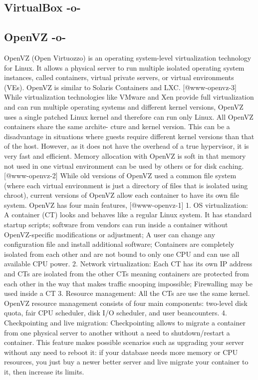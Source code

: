 \subsection{VirtualBox -o-}



\subsection{OpenVZ -o-}

OpenVZ (Open Virtuozzo) is an operating system-level virtualization
technology for Linux. It allows a physical server to run multiple
isolated operating system instances, called containers, virtual
private servers, or virtual environments (VEs). OpenVZ is similar to
Solaris Containers and LXC. [@www-openvz-3] While virtualization
technologies like VMware and Xen provide full virtualization and can
run multiple operating systems and different kernel versions, OpenVZ
uses a single patched Linux kernel and therefore can run only
Linux. All OpenVZ containers share the same archite- cture and kernel
version. This can be a disadvantage in situations where guests require
different kernel versions than that of the host. However, as it does
not have the overhead of a true hypervisor, it is very fast and
efficient. Memory allocation with OpenVZ is soft in that memory not
used in one virtual environment can be used by others or for disk
caching. [@www-openvz-2] While old versions of OpenVZ used a
common file system (where each virtual environment is just a directory
of files that is isolated using chroot), current versions of OpenVZ
allow each container to have its own file system.  OpenVZ has four
main features, [@www-openvz-1] 1. OS virtualization: A container
(CT) looks and behaves like a regular Linux system. It has standard
startup scripts; software from vendors can run inside a container
without OpenVZ-specific modifications or adjustment; A user can change
any configuration file and install additional software; Containers are
completely isolated from each other and are not bound to only one CPU
and can use all available CPU power.  2. Network virtualization: Each
CT has its own IP address and CTs are isolated from the other CTs
meaning containers are protected from each other in the way that makes
traffic snooping impossible; Firewalling may be used inside a CT
3. Resource management: All the CTs are use the same kernel. OpenVZ
resource management consists of four main components: two-level disk
quota, fair CPU scheduler, disk I/O scheduler, and user beancounters.
4. Checkpointing and live migration: Checkpointing allows to migrate a
container from one physical server to another without a need to
shutdown/restart a container. This feature makes possible scenarios
such as upgrading your server without any need to reboot it: if your
database needs more memory or CPU resources, you just buy a newer
better server and live migrate your container to it, then increase its
limits.


